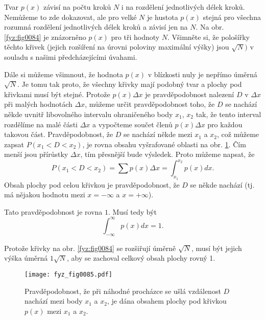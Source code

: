     Tvar \(p(x)\) závisí na počtu kroků \(N\) i na rozdělení jednotlivých délek kroků. Nemůžeme to 
    zde dokazovat, ale pro velké \(N\) je hustota \(p(x)\) stejná pro všechna rozumná rozdělení 
    jednotlivých délek kroků a závisí jen na \(N\). Na obr. \ref{fyz:fig0084} je znázorněno \(p(x)\) 
    pro tři hodnoty \(N\). Všimněte si, že pološířky těchto křivek (jejich rozšíření na úrovni 
    poloviny maximální výšky) jsou \(\sqrt{N})\) v souladu s našimi předcházejícími úvahami.
    
    Dále si můžeme všimnout, že hodnota \(p(x)\) v blízkosti nuly je nepřímo úměrná \(\sqrt{N}\). 
    Je tomu tak proto, že všechny křivky mají podobný tvar a plochy pod křivkami musí být stejné. 
    Protože \(p(x)\Delta x\) je pravděpodobnost nalezení \(D\) v \(\Delta x\) při malých hodnotách 
    \(\Delta x\), můžeme určit pravděpodobnost toho, že \(D\) se nachází někde uvnitř libovolného 
    intervalu ohraničeného body \(x_1\), \(x_2\) tak, že tento interval rozdělíme na malé části 
    \(\Delta x\) a vypočteme součet členů \(p(x)\Delta x\) pro každou takovou část.     
    Pravděpodobnost, že \(D\) se nachází někde mezi \(x_1\) a \(x_2\), což můžeme zapsat \(P(x_1 < 
    D < x_2)\), je rovna obsahu vyšrafované oblasti na obr. \ref{fyz:fig0085}. Čím menší jsou 
    přírůstky \(\Delta x\), tím přesnější bude výsledek. Proto můžeme napsat, že
    \begin{equation}\label{fyz:eq089}
      P(x_1 < D < x_2) = \sum p(x)\Delta x = \int_{x_1}^{x_2}p(x)dx.
    \end{equation}
    Obsah plochy pod celou křivkou je pravděpodobnost, že \(D\) se někde nachází (tj. má nějakou 
    hodnotu mezi \(x=-\infty\) a  \(x= +\infty\)).

      
    Tato pravděpodobnost je rovna \(1\). Musí tedy být
    \begin{equation}\label{fyz:eq090}
      \int_{-\infty}^{\infty}p(x)dx = 1.
    \end{equation}
    
    Protože křivky na obr. \ref{fyz:fig0084} se rozšiřují úměrně \(\sqrt{N}\), musí být jejich výška 
    úměrná \(1\sqrt{N}\), aby se zachoval celkový obsah plochy rovný \num{1}.

    \begin{figure}[ht!]  %
      \centering
      \texttt{[image: fyz\_fig0085.pdf]}
      \caption{Pravděpodobnost, že při náhodné procházce se ušlá vzdálenost \(D\) nachází mezi 
                body  \(x_1\) a \(x_2\), je dána obsahem plochy pod křivkou \(p(x)\) mezi \(x_1\) a 
                \(x_2\).
                \cite[s.~87]{Feynman01}}
       \label{fyz:fig0085}
    \end{figure}
    
